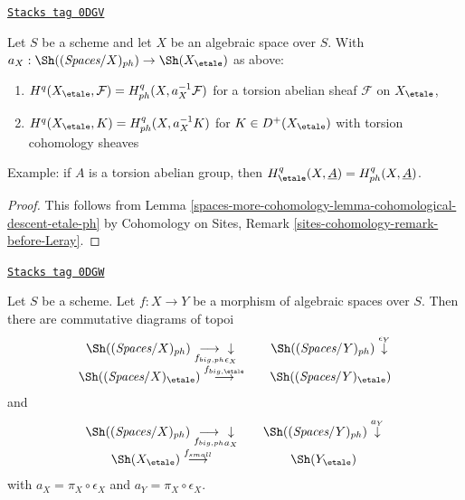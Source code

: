 \begin{lemma}
\label{spaces-more-cohomology-lemma-compare-cohomology-etale-ph}
\href{https://stacks.math.columbia.edu/tag/0DGV}{\texttt{Stacks tag 0DGV}}

Let $S$ be a scheme and let $X$ be an algebraic space over $S$.
With $a_X : \Sh((\textit{Spaces}/X)_{ph}) \to \Sh(X_\etale)$
as above:
\begin{enumerate}
\item $H^q(X_\etale, \mathcal{F}) = H^q_{ph}(X, a_X^{-1}\mathcal{F})$
for a torsion abelian sheaf $\mathcal{F}$ on $X_\etale$,
\item $H^q(X_\etale, K) = H^q_{ph}(X, a_X^{-1}K)$ for $K \in D^+(X_\etale)$
with torsion cohomology sheaves
\end{enumerate}
Example: if $A$ is a torsion abelian group, then
$H^q_\etale(X, \underline{A}) = H^q_{ph}(X, \underline{A})$.
\end{lemma}

\begin{proof}
This follows from Lemma \ref{spaces-more-cohomology-lemma-cohomological-descent-etale-ph}
by Cohomology on Sites, Remark \ref{sites-cohomology-remark-before-Leray}.
\end{proof}

\begin{lemma}
\label{spaces-more-cohomology-lemma-push-pull-ph-etale}
\href{https://stacks.math.columbia.edu/tag/0DGW}{\texttt{Stacks tag 0DGW}}

Let $S$ be a scheme.
Let $f : X \to Y$ be a morphism of algebraic spaces over $S$.
Then there are commutative diagrams of topoi
$$
\begin{array}{ccc}\Sh((\textit{Spaces}/X)_{ph}) \underset{f_{big, ph}}{\longrightarrow}\underset{\epsilon_X}{\downarrow} &  & \Sh((\textit{Spaces}/Y)_{ph}) \overset{\epsilon_Y}{\downarrow} \\ \Sh((\textit{Spaces}/X)_\etale) \overset{f_{big, \etale}}{\longrightarrow} &  & \Sh((\textit{Spaces}/Y)_\etale)\end{array}
$$
and
$$
\begin{array}{ccc}\Sh((\textit{Spaces}/X)_{ph}) \underset{f_{big, ph}}{\longrightarrow}\underset{a_X}{\downarrow} &  & \Sh((\textit{Spaces}/Y)_{ph}) \overset{a_Y}{\downarrow} \\ \Sh(X_\etale) \overset{f_{small}}{\longrightarrow} &  & \Sh(Y_\etale)\end{array}
$$
with $a_X = \pi_X \circ \epsilon_X$ and $a_Y = \pi_X \circ \epsilon_X$.
\end{lemma}

